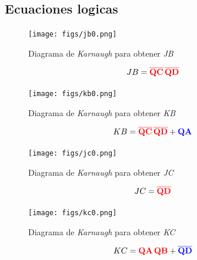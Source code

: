 \documentclass[12pt, oneside]{article}
\begin{document}
\subsection{Ecuaciones logicas}
{\sffamily\large
    \begin{figure}[h!]
        \centering
        \texttt{[image: figs/jb0.png]}
        \caption{\sffamily Diagrama de \emph{Karnaugh} para obtener \emph{JB}}
        \label{fig:karJB}
    \end{figure}

    \begin{equation*}
        JB =
        \mathbf{
            \textcolor{rojo}{\overline{QC}\, \overline{QD}}
        }
    \end{equation*}

    \begin{figure}[h!]
        \centering
        \texttt{[image: figs/kb0.png]}
        \caption{\sffamily Diagrama de \emph{Karnaugh} para obtener \emph{KB}}
        \label{fig:karKB}
    \end{figure}

    \begin{equation*}
        KB =
        \mathbf{
            \textcolor{rojo}{\overline{QC}\, \overline{QD}}
            + \textcolor{azul}{QA}
        }
    \end{equation*}

}

\newpage
{\sffamily\large
    \begin{figure}[h!]
        \centering
        \texttt{[image: figs/jc0.png]}
        \caption{\sffamily Diagrama de \emph{Karnaugh} para obtener \emph{JC}}
        \label{fig:karJC}
    \end{figure}

    \begin{equation*}
        JC =
        \mathbf{
            \textcolor{rojo}{\overline{QD}}
        }
    \end{equation*}

    \begin{figure}[h!]
        \centering
        \texttt{[image: figs/kc0.png]}
        \caption{\sffamily Diagrama de \emph{Karnaugh} para obtener \emph{KC}}
        \label{fig:karKC}
    \end{figure}

    \begin{equation*}
        KC =
        \mathbf{
            \textcolor{rojo}{QA\, QB} + \textcolor{azul}{\overline{QD}}
        }
    \end{equation*}
}
\end{document}
